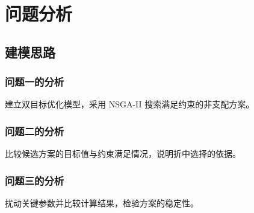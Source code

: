 \section{问题分析}
\label{sec:analysis}
\subsection{建模思路}
\subsubsection{问题一的分析}
建立双目标优化模型，采用 NSGA-II 搜索满足约束的非支配方案。

\subsubsection{问题二的分析}
比较候选方案的目标值与约束满足情况，说明折中选择的依据。

\subsubsection{问题三的分析}
扰动关键参数并比较计算结果，检验方案的稳定性。

